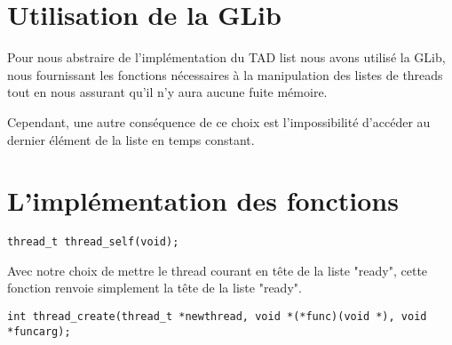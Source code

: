 \section {Utilisation de la GLib}

Pour nous abstraire de l'implémentation du TAD list nous avons utilisé
la GLib, nous fournissant les fonctions nécessaires à la manipulation
des listes de threads tout en nous assurant qu'il n'y aura aucune
fuite mémoire.

Cependant, une autre conséquence de ce choix est l'impossibilité
d'accéder au dernier élément de la liste en temps constant.

\section {L'implémentation des fonctions}

\begin{verbatim}
thread_t thread_self(void);
\end{verbatim}
Avec notre choix de mettre le thread courant en tête de la liste "ready",
cette fonction renvoie simplement la tête de la liste "ready".
~~\\
\begin{verbatim}
int thread_create(thread_t *newthread, void *(*func)(void *), void *funcarg);
\end{verbatim}


